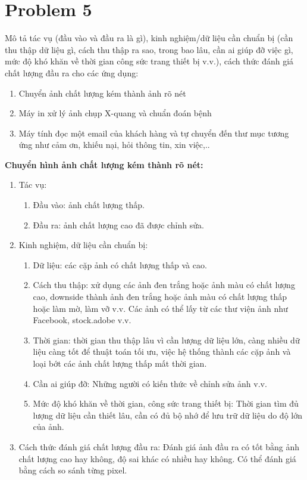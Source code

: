 \documentclass[12pt,letterpaper]{article}
\begin{document}
\section* {Problem 5}
Mô tả tác vụ (đầu vào và đầu ra là gì), kinh nghiệm/dữ liệu cần chuẩn bị (cần thu thập dữ liệu gì, cách thu thập ra sao, trong bao lâu, cần ai giúp đỡ việc gì, mức độ khó khăn về thời gian công sức trang thiết bị v.v.), cách thức đánh giá chất lượng đầu ra cho các ứng dụng:
\begin{enumerate}
    \item Chuyển ảnh chất lượng kém thành ảnh rõ nét
    \item Máy in xử lý ảnh chụp X-quang và chuẩn đoán bệnh
    \item Máy tính đọc một email của khách hàng và tự chuyển đến thư mục tương ứng như cảm ơn, khiếu nại, hỏi thông tin, xin việc,..
\end{enumerate}

\textbf {Chuyển hình ảnh chất lượng kém thành rõ nét:}
\begin{enumerate}
    \item Tác vụ:
    \begin{enumerate}
        \item Đầu vào: ảnh chất lượng thấp.
        \item Đầu ra: ảnh chất lượng cao đã được chỉnh sửa.
    \end{enumerate}
    \item Kinh nghiệm, dữ liệu cần chuẩn bị:
    \begin{enumerate}
        \item Dữ liệu: các cặp ảnh có chất lượng thấp và cao.
        \item Cách thu thập: xử dụng các ảnh đen trắng hoặc ảnh màu có chất lượng cao, downside thành ảnh đen trắng hoặc ảnh màu có chất lượng thấp hoặc làm mờ, làm vỡ v.v. Các ảnh có thể lấy từ các thư viện ảnh như Facebook, stock.adobe v.v.
        \item Thời gian: thời gian thu thập lâu vì cần lượng dữ liệu lớn, càng nhiều dữ liệu càng tốt để thuật toán tối ưu, việc hệ thống thành các cặp ảnh và loại bớt các ảnh chất lượng thấp mất thời gian.
        \item Cần ai giúp đỡ: Những người có kiến thức về chỉnh sửa ảnh v.v.
        \item Mức độ khó khăn về thời gian, công sức trang thiết bị: Thời gian tìm đủ lượng dữ liệu cần thiết lâu, cần có đủ bộ nhớ để lưu trữ dữ liệu do độ lớn của ảnh.
    \end{enumerate}
    \item Cách thức đánh giá chất lượng đầu ra: Đánh giá ảnh đầu ra có tốt bằng ảnh chất lượng cao hay không, độ sai khác có nhiều hay không. Có thể đánh giá bằng cách so sánh từng pixel.
\end{enumerate}
\end{document}
